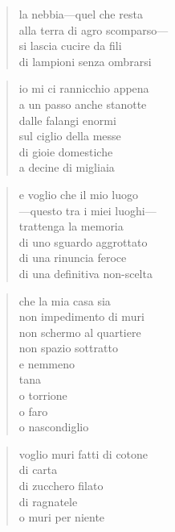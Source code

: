 \begin{verse}
    la nebbia—quel che resta\\
    alla terra di agro scomparso—\\
    si lascia cucire da fili\\
    di lampioni senza ombrarsi
\end{verse}

\begin{verse}
    io mi ci rannicchio appena\\
    a un passo anche stanotte\\
    dalle falangi enormi\\
    sul ciglio della messe\\
    di gioie domestiche\\
    a decine di migliaia
\end{verse}

\begin{verse}
    e voglio che il mio luogo\\
    —questo tra i miei luoghi—\\
    trattenga la memoria\\
    di uno sguardo aggrottato\\
    di una rinuncia feroce\\
    di una definitiva non-scelta
\end{verse}

\clearpage


\begin{verse}
    che la mia casa sia\\
    non impedimento di muri\\
    non schermo al quartiere\\
    non spazio sottratto\\
    e nemmeno\\
    tana\\
    o torrione\\
    o faro\\
    o nascondiglio
\end{verse}

\begin{verse}
    voglio muri fatti di cotone\\
    di carta\\
    di zucchero filato\\
    di ragnatele\\
    o muri per niente
\end{verse}

